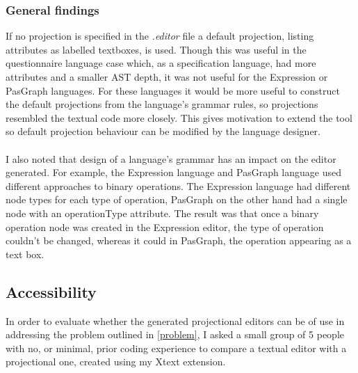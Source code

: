 \documentclass{article}
\begin{document}
{%

\subsubsection{General findings}
If no projection is specified in the \emph{.editor} file a default projection, listing attributes as labelled textboxes, is used. Though this was useful in the questionnaire language case which, as a specification language, had more attributes and a smaller AST depth, it was not useful for the Expression or PasGraph languages. For these languages it would be more useful to construct the default projections from the language's grammar rules, so projections resembled the textual code more closely. This gives motivation to extend the tool so default projection behaviour can be modified by the language designer.
\\
\\
I also noted that design of a language's grammar has an impact on the editor generated. For example, the Expression language and PasGraph language used different approaches to binary operations. The Expression language had different node types for each type of operation, PasGraph on the other hand had a single node with an operationType attribute. The result was that once a binary operation node was created in the Expression editor, the type of operation couldn't be changed, whereas it could in PasGraph, the operation appearing as a text box.

\subsection{Accessibility}\label{Accessibility}
In order to evaluate whether the generated projectional editors can be of use in addressing the problem outlined in \ref{problem}, I asked a small group of 5 people with no, or minimal, prior coding experience to compare a textual editor with a projectional one, created using my Xtext extension.

}
\end{document}
